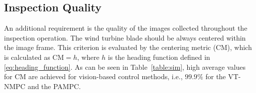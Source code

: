  
 
 
\subsection{Inspection Quality }



An additional requirement is the quality of the images collected throughout the inspection operation. The wind turbine blade should be always centered within the image frame.
This criterion is evaluated by the centering metric (CM), which is calculated as $\mathrm{CM} = h$, where $h$ is the heading function defined in \eqref{eq:heading_function}. As can be seen in Table~\ref{table:sim}, high average values for CM are achieved for vision-based control methods, i.e., $99.9\%$ for the VT-NMPC and the PAMPC.
















